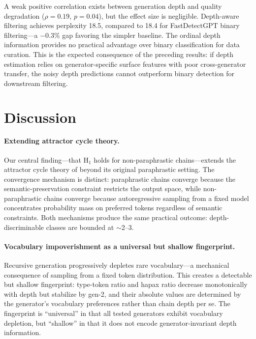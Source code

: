 \documentclass[letterpaper]{article}
\begin{document}
A weak positive correlation exists between generation depth and quality degradation ($\rho = 0.19$, $p = 0.04$), but the effect size is negligible. Depth-aware filtering achieves perplexity 18.5, compared to 18.4 for FastDetectGPT binary filtering---a $-0.3\%$ gap favoring the simpler baseline. The ordinal depth information provides no practical advantage over binary classification for data curation. This is the expected consequence of the preceding results: if depth estimation relies on generator-specific surface features with poor cross-generator transfer, the noisy depth predictions cannot outperform binary detection for downstream filtering.

\section{Discussion}
\label{sec:discussion}

\paragraph{Extending attractor cycle theory.}
Our central finding---that H$_1$ holds for non-paraphrastic chains---extends the attractor cycle theory of \citet{anonymous2025attractor} beyond its original paraphrastic setting. The convergence mechanism is distinct: paraphrastic chains converge because the semantic-preservation constraint restricts the output space, while non-paraphrastic chains converge because autoregressive sampling from a fixed model concentrates probability mass on preferred tokens regardless of semantic constraints. Both mechanisms produce the same practical outcome: depth-discriminable classes are bounded at $\sim$2--3.

\paragraph{Vocabulary impoverishment as a universal but shallow fingerprint.}
Recursive generation progressively depletes rare vocabulary---a mechanical consequence of sampling from a fixed token distribution. This creates a detectable but shallow fingerprint: type-token ratio and hapax ratio decrease monotonically with depth but stabilize by gen-2, and their absolute values are determined by the generator's vocabulary preferences rather than chain depth per se. The fingerprint is ``universal'' in that all tested generators exhibit vocabulary depletion, but ``shallow'' in that it does not encode generator-invariant depth information.
\end{document}
